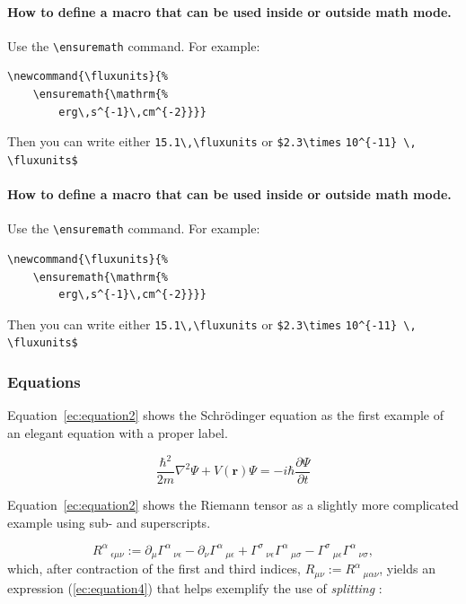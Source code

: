 \documentclass[9pt,article,twoside]{fapet-rho-class/fapet-rho}
\newcommand{\CS}[1]{\texttt{\textbackslash #1}}
\begin{document}
        \paragraph{How to define a macro that can be used inside or outside math mode.} Use the \CS{ensuremath} command. For example: 
    
\begin{verbatim}
\newcommand{\fluxunits}{%
    \ensuremath{\mathrm{%
        erg\,s^{-1}\,cm^{-2}}}}
\end{verbatim}
    
        Then you can write either \verb+15.1\,\fluxunits+ or \verb+$2.3\times+ \verb+10^{-11} \,+ \verb+\fluxunits$+
    
        \paragraph{How to define a macro that can be used inside or outside math mode.} Use the \CS{ensuremath} command. For example: 
        
\begin{verbatim}
\newcommand{\fluxunits}{%
    \ensuremath{\mathrm{%
        erg\,s^{-1}\,cm^{-2}}}}
\end{verbatim}
    
        Then you can write either \verb+15.1\,\fluxunits+ or \verb+$2.3\times+ \verb+10^{-11} \,+ \verb+\fluxunits$+

    \subsubsection{Equations}

        Equation~\ref{ec:equation2} shows the Schrödinger equation as the first example of an elegant equation with a proper label.

    \begin{equation} \label{ec:equation2}
         \frac{\hbar^2}{2m}\nabla^2\Psi + V(\mathbf{r})\Psi = -i\hbar \frac{\partial\Psi}{\partial t}
    \end{equation} 

    Equation~\ref{ec:equation2} shows the Riemann tensor as a slightly more complicated example using sub- and superscripts.

    \begin{equation} \label{ec:equation3}
        R^\alpha\,_{\epsilon\mu\nu}:=\partial_\mu\Gamma^\alpha\,_{\nu\epsilon}
	-\partial_\nu\Gamma^\alpha\,_{\mu\epsilon}
	+\Gamma^\sigma\,_{\nu\epsilon} \Gamma^\alpha\,_{\mu\sigma}
	-\Gamma^\sigma\,_{\mu\epsilon} \Gamma^\alpha\,_{\nu\sigma},
    \end{equation}
    which, after contraction of the first and third indices, $R_{\mu\nu}:=R^\alpha\,_{\mu\alpha\nu}$, yields an expression (\ref{ec:equation4}) that helps exemplify the use of \textit{splitting} \citep{BarMen17}:
\end{document}
